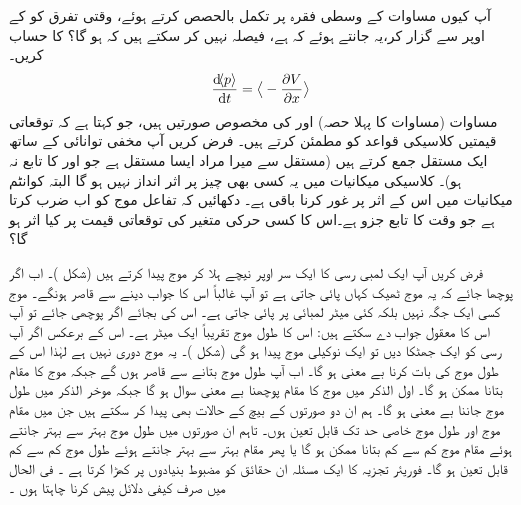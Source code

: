 آپ کیوں مساوات  کے وسطی فقرہ پر تکمل بالحصص کرتے ہوئے، وقتی تفرق کو  کے اوپر سے گزار کر،یہ جانتے ہوئے کہ  ہے، فیصلہ نہیں کر سکتے ہیں کہ  ہو گا؟
 کا حساب کریں۔
\begin{align}\label{مساوات_تفاعل_موج_مخفی_توانائی_سے_معیار_حرکت}
\frac{\dif\langle p \rangle}{\dif t}=\big\langle-\frac{\partial V}{\partial x} \big\rangle
\end{align}
مساوات  (مساوات  کا پہلا حصہ) اور   کی مخصوص صورتیں ہیں، جو کہتا ہے کہ توقعاتی قیمتیں کلاسیکی قواعد کو مطمئن کرتے ہیں۔
فرض کریں آپ مخفی توانائی کے ساتھ ایک مستقل جمع کرتے ہیں (مستقل سے میرا مراد ایسا مستقل ہے  جو  اور  کا تابع نہ ہو)۔ کلاسیکی میکانیات میں یہ کسی بھی چیز پر اثر انداز نہیں ہو گا البتہ کوانٹم میکانیات میں اس کے اثر پر غور کرنا باقی ہے۔ دکھائیں کہ تفاعل موج کو اب  ضرب کرتا ہے جو وقت کا تابع جزو ہے۔اس کا کسی حرکی متغیر کی توقعاتی قیمت پر کیا اثر ہو گا؟ 

فرض کریں آپ ایک لمبی رسی کا ایک سر اوپر نیچے  ہلا کر موج پیدا کرتے ہیں (شکل )۔ اب اگر پوچھا جائے کہ یہ موج ٹھیک  کہاں پائی جاتی ہے تو آپ غالباً اس کا جواب دینے سے قاصر ہونگے۔ موج کسی ایک جگہ نہیں بلکہ کئی میٹر لمبائی پر پائی جاتی ہے۔ اس کی بجائے اگر   پوچھی جائے  تو آپ اس کا معقول جواب دے سکتے ہیں:  اس کا طول موج تقریباً ایک میٹر ہے۔ اس کے برعکس اگر آپ رسی کو ایک جھٹکا دیں تو  ایک نوکیلی موج پیدا ہو گی (شکل )۔ یہ موج دوری نہیں ہے لہٰذا اس کے طول موج کی بات کرنا بے معنی ہو گا۔ اب آپ طول موج بتانے سے قاصر ہوں گے جبکہ  موج کا مقام بتانا ممکن ہو گا۔ اول الذکر  میں موج کا مقام پوچھنا بے معنی سوال ہو گا جبکہ موخر الذکر میں طول موج جاننا بے معنی  ہو گا۔ ہم ان دو صورتوں کے بیچ کے حالات بھی پیدا کر سکتے ہیں  جن میں  مقام موج   اور  طول موج خاصی حد تک قابل تعین ہوں۔ تاہم ان صورتوں میں طول موج بہتر سے بہتر جانتے ہوئے مقام موج کم سے کم بتانا ممکن ہو گا یا پھر مقام بہتر سے بہتر جانتے ہوئے طول موج کم سے کم قابل تعین  ہو گا۔ فوریئر تجزیہ کا ایک مسئلہ ان حقائق کو مضبوط بنیادوں پر کھڑا کرتا ہے ۔ فی الحال میں صرف کیفی دلائل پیش کرنا چاہتا ہوں ۔

